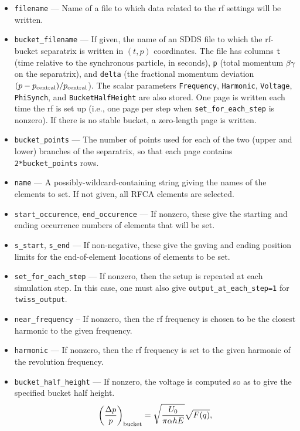 \documentclass[11pt]{article}
\begin{document}
\begin{itemize}
\item \verb|filename| --- Name of a file to which data related to the rf settings will be written.
\item \verb|bucket_filename| --- If given, the name of an SDDS file to which the rf-bucket separatrix is
  written in $(t,p)$ coordinates.  The file has columns \verb|t| (time relative to the synchronous particle, in
  seconds), \verb|p| (total momentum $\beta\gamma$ on the separatrix), and \verb|delta| (the fractional momentum
  deviation $(p-p_{\rm central})/p_{\rm central}$).  The scalar parameters \verb|Frequency|, \verb|Harmonic|,
  \verb|Voltage|, \verb|PhiSynch|, and \verb|BucketHalfHeight| are also stored.  One page is written each time the
  rf is set up (i.e., one page per step when \verb|set_for_each_step| is nonzero).  If there is no stable bucket, a zero-length page
  is written.
\item \verb|bucket_points| --- The number of points used for each of the two (upper and lower) branches of the
  separatrix, so that each page contains \verb|2*bucket_points| rows.
\item \verb|name| --- A possibly-wildcard-containing string giving the names of the
        elements to set.  If not given, all RFCA elements are selected.
\item \verb|start_occurence|, \verb|end_occurence| --- If nonzero, these give the starting and
 ending occurrence numbers of elements that will be set. 
\item \verb|s_start|, \verb|s_end| --- If non-negative, these give the gaving and ending position
 limits for the end-of-element locations of elements to be set.
\item \verb|set_for_each_step| --- If nonzero, then the setup is repeated at each simulation step.
  In this case, one must also give \verb|output_at_each_step=1| for \verb|twiss_output|.
\item \verb|near_frequency| -- If nonzero, then the rf frequency is chosen to be the closest harmonic
  to the given frequency.
\item \verb|harmonic| --- If nonzero, then the rf frequency is set to the given harmonic of the revolution
  frequency.
\item \verb|bucket_half_height| --- If nonzero, the voltage is computed so as to give the specified bucket
  half height. 
\begin{equation}
\left(\frac{\Delta p}{p}\right)_{\rm bucket} = \sqrt{\frac{U_0}{\pi \alpha h E}}\sqrt{F(q)},

\end{equation}
\end{itemize}
\end{document}
